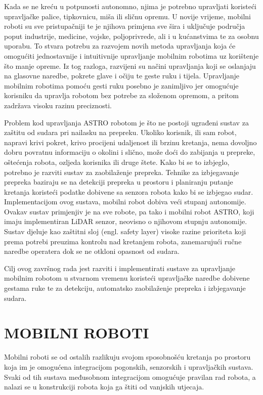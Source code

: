 \documentclass[12pt,a4paper,oneside]{report}
\begin{document}
Kada se ne kreću u potpunosti autonomno, njima je potrebno upravljati 
koristeći upravljačke palice, tipkovnicu, miša ili sličnu opremu. 
U novije vrijeme, mobilni roboti su sve pristupačniji te je njihova 
primjena sve šira i uključuje područja poput industrije, 
medicine, vojske, poljoprivrede, ali i u kućanstvima te za osobnu uporabu. 
To stvara potrebu za razvojem novih metoda upravljanja koja 
će omogućiti jednostavnije i intuitivnije upravljanje mobilnim robotima 
uz korištenje što manje opreme. Iz tog razloga, razvijeni su načini 
upravljanja koji se oslanjaju na glasovne naredbe, pokrete glave i očiju te 
geste ruku i tijela. 
Upravljanje mobilnim robotima pomoću gesti ruku posebno je zanimljivo 
jer omogućuje korisniku da upravlja robotom bez potrebe za 
složenom opremom, a pritom zadržava visoku razinu preciznosti. 


Problem kod upravljanja ASTRO robotom je što ne postoji ugrađeni sustav za zaštitu od sudara 
pri nailasku na prepreku. Ukoliko korisnik, ili sam robot, 
napravi krivi pokret, krivo procijeni udaljenost ili brzinu kretanja, 
nema dovoljno dobru povratnu informaciju o okolini i slično, 
može doći do zabijanja u prepreke, oštećenja robota, ozljeda korisnika ili druge štete. 
Kako bi se to izbjeglo, potrebno je razviti sustav za zaobilaženje prepreka. 
Tehnike za izbjegavanje prepreka baziraju se na detekciji prepreka u prostoru 
i planiranju putanje kretanja koristeći podatke dobivene sa senzora 
robota kako bi se izbjegao sudar. Implementacijom ovog sustava, 
mobilni robot dobiva veći stupanj autonomije.
Ovakav sustav primjenjiv je na sve robote, pa tako i mobilni robot ASTRO, koji imaju 
implementiran LiDAR senzor, neovisno o njihovom stupnju autonomije. 
Sustav djeluje kao zaštitni sloj (engl. safety layer) visoke razine prioriteta koji 
prema potrebi preuzima kontrolu nad kretanjem robota, zanemarujući ručne naredbe operatera 
dok se ne otkloni opasnost od sudara.

Cilj ovog završnog rada jest razviti i implementirati sustave za upravljanje mobilnim robotom 
u stvarnom vremenu koristeći upravljačke naredbe dobivene gestama ruke te za 
detekciju, automatsko zaobilaženje prepreka i izbjegavanje sudara.

\pagebreak

\chapter{MOBILNI ROBOTI}
Mobilni roboti se od ostalih razlikuju svojom sposobnošću kretanja po prostoru 
koja im je omogućena integracijom pogonskih, senzorskih i upravljačkih sustava. 
Svaki od tih sustava međusobnom integracijom omogućuje pravilan rad robota, a nalazi 
se u konstrukciji robota koja ga štiti od vanjskih utjecaja.
\end{document}
